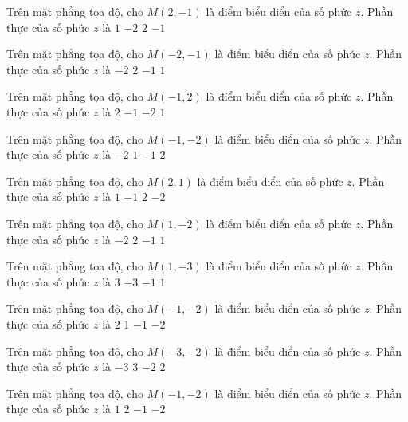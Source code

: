 \begin{ex}
 Trên mặt phẳng tọa độ, cho $M(2,-1)$ là điểm biểu diển của số phức $z$. Phần thực của số phức $z$ là
\choice
{$1$}
{$-2$}
{\True $2$}
{$-1$}
\end{ex}
\begin{ex}
 Trên mặt phẳng tọa độ, cho $M(-2,-1)$ là điểm biểu diển của số phức $z$. Phần thực của số phức $z$ là
\choice
{\True $-2$}
{$2$}
{$-1$}
{$1$}
\end{ex}
\begin{ex}
 Trên mặt phẳng tọa độ, cho $M(-1,2)$ là điểm biểu diển của số phức $z$. Phần thực của số phức $z$ là
\choice
{$2$}
{\True $-1$}
{$-2$}
{$1$}
\end{ex}
\begin{ex}
 Trên mặt phẳng tọa độ, cho $M(-1,-2)$ là điểm biểu diển của số phức $z$. Phần thực của số phức $z$ là
\choice
{$-2$}
{$1$}
{\True $-1$}
{$2$}
\end{ex}
\begin{ex}
 Trên mặt phẳng tọa độ, cho $M(2,1)$ là điểm biểu diển của số phức $z$. Phần thực của số phức $z$ là
\choice
{$1$}
{$-1$}
{\True $2$}
{$-2$}
\end{ex}
\begin{ex}
 Trên mặt phẳng tọa độ, cho $M(1,-2)$ là điểm biểu diển của số phức $z$. Phần thực của số phức $z$ là
\choice
{$-2$}
{$2$}
{$-1$}
{\True $1$}
\end{ex}
\begin{ex}
 Trên mặt phẳng tọa độ, cho $M(1,-3)$ là điểm biểu diển của số phức $z$. Phần thực của số phức $z$ là
\choice
{$3$}
{$-3$}
{$-1$}
{\True $1$}
\end{ex}
\begin{ex}
 Trên mặt phẳng tọa độ, cho $M(-1,-2)$ là điểm biểu diển của số phức $z$. Phần thực của số phức $z$ là
\choice
{$2$}
{$1$}
{\True $-1$}
{$-2$}
\end{ex}
\begin{ex}
 Trên mặt phẳng tọa độ, cho $M(-3,-2)$ là điểm biểu diển của số phức $z$. Phần thực của số phức $z$ là
\choice
{\True $-3$}
{$3$}
{$-2$}
{$2$}
\end{ex}
\begin{ex}
 Trên mặt phẳng tọa độ, cho $M(-1,-2)$ là điểm biểu diển của số phức $z$. Phần thực của số phức $z$ là
\choice
{$1$}
{$2$}
{\True $-1$}
{$-2$}
\end{ex}
